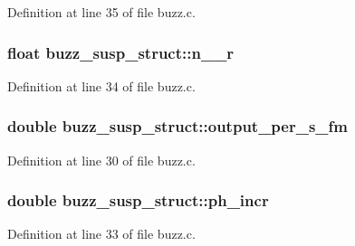 Definition at line 35 of file buzz.\+c.

\subsubsection[{\texorpdfstring{n\+\_\+2\+\_\+r}{n_2_r}}]{\setlength{\rightskip}{0pt plus 5cm}float buzz\+\_\+susp\+\_\+struct\+::n\+\_\+\_\+r}\hypertarget{structbuzz__susp__struct_a8a57fa2e268144c5f1da152578a25a96}{}\label{structbuzz__susp__struct_a8a57fa2e268144c5f1da152578a25a96}


Definition at line 34 of file buzz.\+c.

\subsubsection[{\texorpdfstring{output\+\_\+per\+\_\+s\+\_\+fm}{output_per_s_fm}}]{\setlength{\rightskip}{0pt plus 5cm}double buzz\+\_\+susp\+\_\+struct\+::output\+\_\+per\+\_\+s\+\_\+fm}\hypertarget{structbuzz__susp__struct_a420a77129f3d2535ca96185a25cdbc83}{}\label{structbuzz__susp__struct_a420a77129f3d2535ca96185a25cdbc83}


Definition at line 30 of file buzz.\+c.

\subsubsection[{\texorpdfstring{ph\+\_\+incr}{ph_incr}}]{\setlength{\rightskip}{0pt plus 5cm}double buzz\+\_\+susp\+\_\+struct\+::ph\+\_\+incr}\hypertarget{structbuzz__susp__struct_adfc0a189f7dffa039afd0fc256ec0a91}{}\label{structbuzz__susp__struct_adfc0a189f7dffa039afd0fc256ec0a91}


Definition at line 33 of file buzz.\+c.

